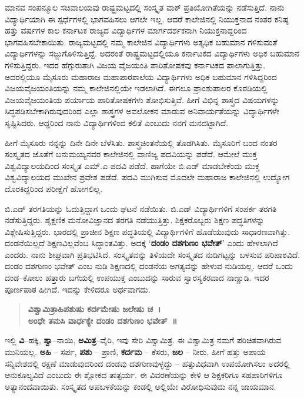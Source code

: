 {ಮಾನವ ಸಂಪನ್ಮೂಲ ಸಚಿವಾಲಯವು ರಾಷ್ಟ್ರಮಟ್ಟದಲ್ಲಿ ಸಂಸ್ಕೃತ ವಾಕ್ ಪ್ರತಿಯೋಗಿತೆಯನ್ನು ನಡೆಸುತ್ತಿದೆ.  ನಾನು ವಿದ್ಯಾರ್ಥಿಯಾಗಿ ಈ ಸ್ಪರ್ಧೆಗಳಲ್ಲಿ ಭಾಗವಹಿಸಲು ಆಗಲೇ ಇಲ್ಲ.  ಆದರೆ ಕಾಲೇಜಿನಲ್ಲಿ ನಿಯುಕ್ತನಾದ ನಂತರ ಕನಿಷ್ಠ ಹತ್ತು ವರ್ಷಗಳ ಕಾಲ ಕರ್ನಾಟಕ ರಾಜ್ಯದ ವಿದ್ಯಾರ್ಥಿಗಳ ಮಾರ್ಗದರ್ಶಕನಾಗಿ ನಿಯುಕ್ತನಾದ್ದರಿಂದ ಭಾಗವಹಿಸಬೇಕಾಯಿತು.  ರಾಜ್ಯಮಟ್ಟದಲ್ಲಿ ನಮ್ಮ ಕಾಲೇಜಿನ ವಿದ್ಯಾರ್ಥಿಗಳು ಅತ್ಯಧಿಕ ಬಹುಮಾನ ಗಳಿಸುವಂತೆ ವಿದ್ಯಾರ್ಥಿಗಳನ್ನು ಸಜ್ಜುಗೊಳಿಸುತ್ತಿದ್ದೆ.  ಅದರಂತೆ ರಾಷ್ಟ್ರಮಟ್ಟದಲ್ಲಿಯೂ ಕರ್ನಾಟಕದ ವಿದ್ಯಾರ್ಥಿಗಳು ಅಧಿಕ ಬಹುಮಾನ ಗಳಿಸುತ್ತಿದ್ದರು.  ಇದರ ಹೆಗ್ಗುರುತಾಗಿ ವಿಜಯ ವೈಜಯಂತಿ ಪಾರಿತೋಷಕವು ಕರ್ನಾಟಕದ ಪಾಲಾಗುತ್ತಿತ್ತು.  ಅದರಲ್ಲಿಯೂ ಮೈಸೂರು ಮಹಾರಾಜ ಮಹಾಪಾಠಶಾಲೆಯ ವಿದ್ಯಾರ್ಥಿಗಳು ಅಧಿಕ ಬಹುಮಾನ ಗಳಿಸಿದ್ದರಿಂದ ವಿಜಯವೈಜಯಂತಿಯನ್ನು ನಮ್ಮ ಕಾಲೇಜಿನಲ್ಲಿಯೇ ಇಡಲಾಗಿದೆ.  ಈಗಲೂ ಪ್ರಾಂಶುಪಾಲರ ಕೊಠಡಿಯಲ್ಲಿ ವಿಜಯವೈಜಯಂತಿಯ ಪರ್ಯಾಯ ಪಾರಿತೋಷಕಗಳು ಶೋಭಿಸುತ್ತಿವೆ.  ಹೀಗೆ ವಿಭಿನ್ನ ಶಾಸ್ತ್ರದ ವಿಷಯಗಳನ್ನು ಸಿದ್ಧಪಡಿಸಬೇಕಾಗಿರುವುದರಿಂದ ಎಲ್ಲಾ ಶಾಸ್ತ್ರಗಳ ಅವಲೋಕನ ಮಾಡುವ ಅನಿವಾರ್ಯತೆಯನ್ನು ವಿದ್ಯಾರ್ಥಿಗಳೇ ಸೃಷ್ಟಿಸಿದರು.   ಆದ್ದರಿಂದ ನಾನು ವಿದ್ಯಾರ್ಥಿಗಳಿಂದ ಕಲಿತೆ ಎಂಬುದು ನನಗೆ ಮನದಟ್ಟಾಗಿದೆ.  

ಹೀಗೆ ಮೈಸೂರು ನನ್ನನ್ನು ದಿನೇ ದಿನೇ ಬೆಳೆಸಿತು.  ಶಾಸ್ತ್ರಚಿಂತನೆಯಲ್ಲಿ ತೊಡಗಿಸಿತು.  ಮೈಸೂರಿಗೆ ಬಂದ ನಂತರ ಸಂಸ್ಕೃತದ ಜೊತೆಗೆ ಬನುಮಯ್ಯನವರ ಕಾಲೇಜಿನಲ್ಲಿ ವಾಣಿಜ್ಯ ಪದವಿಯನ್ನು ಪಡೆದೆ. ಆಮೇಲೆ ಮುಕ್ತ ವಿಶ್ವವಿದ್ಯಾಲಯದಿಂದ ಸಂಸ್ಕೃತ ಎಮ್.ಎ ಪದವಿ ಪಡೆದೆ. ಹಾಗೆಯೇ ಬಿ.ಎಡ್ ಮಾಡಬೇಕೆಂದು ಮುಕ್ತ ವಿಶ್ವವಿದ್ಯಾಲಯದ ಮುಖೇನ ಪ್ರವೇಶ ಪಡೆದೆ. ಪದವಿ ಮುಗಿಸುವ ಮೊದಲೇ ಮಹಾರಾಜ ಕಾಲೇಜಿನಲ್ಲಿ ಉದ್ಯೋಗ ದೊರಕಿದ್ದರಿಂದ ಪರೀಕ್ಷೆಗೆ ಹೋಗಲಿಲ್ಲ.  

ಬಿ.ಎಡ್ ತರಗತಿಯನ್ನು ಓದುತ್ತಿದ್ದಾಗ ಒಂದು ಘಟನೆ ನಡೆಯಿತು.  ಬಿ.ಎಡ್ ವಿದ್ಯಾರ್ಥಿಗಳಿಗೆ ಸಂಪರ್ಕ ತರಗತಿ ನಡೆಸುತ್ತಿದ್ದರು. ಶೈಕ್ಷಣಿಕ ಮನೋವಿಜ್ಞಾನದ ತರಗತಿ ನಡೆಯುತ್ತಿತ್ತು.  ಶಿಕ್ಷಕರೊಬ್ಬರು ಶಿಕ್ಷಣ ಪದ್ಧತಿಗಳನ್ನು ವಿಶ್ಲೇಷಿಸುತ್ತಿದ್ದರು.  ಭಾರದಲ್ಲಿ ಪ್ರಾಚೀನ ಶಿಕ್ಷಣ ಪದ್ಧತಿಯಲ್ಲಿ ವಿದ್ಯಾರ್ಥಿಗಳಿಗೆ ಹೊಡೆಯುವುದು ಸಾಧಾರಣವಾಗಿತ್ತು. ದಂಡನೆಯಿಲ್ಲದೆ ಶಿಕ್ಷಣವಿಲ್ಲವೆಂಬ ಸಿದ್ಧಾಂತವಿತ್ತು.  ಅದಕ್ಕೆ ‘\textbf{ದಂಡಂ ದಶಗುಣಂ ಭವೇತ್}’ ಎಂದು ಹೇಳಲಾಗಿದೆ ಎಂದರು.  ನಾನು ಶೀಘ್ರವಾಗಿ ಪ್ರತಿಭಟಿಸಿದೆ.  ಸಂಸ್ಕೃತವನ್ನು ತಿಳಿಯದೇ ಸಂಸ್ಕೃತದ ನುಡಿಗಟ್ಟನ್ನು ಬಳಸುವ ಪರಿಪಾಠವಿದೆ.  ದಂಡಂ ದಶಗುಣಂ ಭವೇತ್ ಎಂಬ ನುಡಿ ಶಿಕ್ಷಣದಲ್ಲಿ ದಂಡನೆಯ ಅಗತ್ಯವನ್ನು ಹೇಳುವ ನುಡಿಯಲ್ಲ.  ಆದರೆ ಒಂದು ದಂಡ–ಕೋಲು ಹತ್ತಾರು ಬಗೆಯಲ್ಲಿ ಉಪಯುಕ್ತ ಎಂಬುದನ್ನು ಸಾರುವ ಸ್ವಾರಸ್ಯಕರವಾದ ನಾಣ್ಣುಡಿ.  ಇದರ ಪೂರ್ಣಪಾಠ ಹೀಗಿದೆ.  ಇದನ್ನು ಕೇಳಿದರೂ ಅರ್ಥವಾಗದು. 
\begin{verse}
{\kannadafont\bfseries ವಿಶ್ವಾಮಿತ್ರಾಹಿಪಶುಷು ಕರ್ದಮೇಷು ಜಲೇಷು ಚ~।\\
ಅಂಧೇ ತಮಸಿ ವಾರ್ಧಕ್ಯೇ ದಂಡಂ ದಶಗುಣಂ ಭವೇತ್~॥}
\end{verse}
ಇಲ್ಲಿ \textbf{ವಿ}–ಹಕ್ಕಿ, \textbf{ಶ್ವಾ}–ನಾಯಿ, \textbf{ಅಮಿತ್ರ}–ವೈರಿ, ಇವು ಸೇರಿ ವಿಶ್ವಾಮಿತ್ರ.  ಈ ವಿಶ್ವಾಮಿತ್ರ ನಮಗೆ ಪರಿಚಿತವಾಗಿರುವ ಮುನಿಯಲ್ಲ.  \textbf{ಅಹಿ} – ಸರ್ಪ, \textbf{ಪಶು} – ಪ್ರಾಣಿ, \textbf{ಕರ್ದಮ} – ಕೆಸರು, \textbf{ಜಲ} – ನೀರು.  ಹೀಗೆ ಹತ್ತು ಅಪಾಯ ಸನ್ನಿವೇಶದಲ್ಲಿ ರಕ್ಷಣೆ ಮಾಡುವುದರಿಂದ ದಂಡವು ದಶಗುಣವುಳ್ಳದ್ದು – ಹತ್ತುವಿಧವಾಗಿ ಉಪಯೋಗಿಸಲು ಅದರಲ್ಲಿ ಆನುಕೂಲ್ಯವಿದೆ ಎಂಬುದು ಈ ಶ್ಲೋಕದ ತಾತ್ಪರ್ಯ.   ಈ ವಿವರಣೆಯನ್ನು ಕೇಳಿ ಆ ಶಿಕ್ಷಕರಿಗೂ ಸಹಪಾಠಿಗಳಿಗೂ ಅತ್ಯಾನಂದವಾಯಿತು.  ಸಂಸ್ಕೃತದ ಅಪಬಳಕೆಯನ್ನು ಕಂಡಲ್ಲಿ ಅಲ್ಲಿಯೇ ವಿರೋಧಿಸುವುದು ನನ್ನ ಜಾಯಮಾನ.  

}
